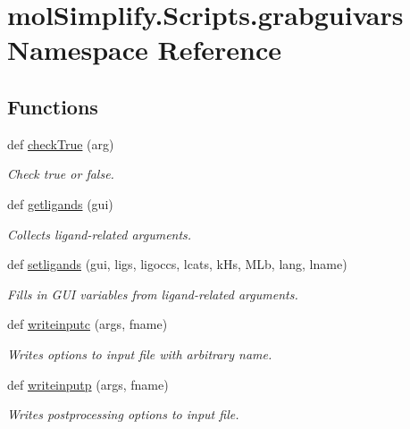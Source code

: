 \hypertarget{namespacemolSimplify_1_1Scripts_1_1grabguivars}{}\section{mol\+Simplify.\+Scripts.\+grabguivars Namespace Reference}
\label{namespacemolSimplify_1_1Scripts_1_1grabguivars}
\subsection*{Functions}
\begin{DoxyCompactItemize}
\item 
def \hyperlink{namespacemolSimplify_1_1Scripts_1_1grabguivars_ada1b06231e634df1c41e807d8d1c9a94}{check\+True} (arg)
\begin{DoxyCompactList}\small\item\em Check true or false. \end{DoxyCompactList}\item 
def \hyperlink{namespacemolSimplify_1_1Scripts_1_1grabguivars_a872962bfed51e6ca90b81fe291cd56b5}{getligands} (gui)
\begin{DoxyCompactList}\small\item\em Collects ligand-\/related arguments. \end{DoxyCompactList}\item 
def \hyperlink{namespacemolSimplify_1_1Scripts_1_1grabguivars_a07e656edb58bbc9b65ef74aca290448e}{setligands} (gui, ligs, ligoccs, lcats, k\+Hs, M\+Lb, lang, lname)
\begin{DoxyCompactList}\small\item\em Fills in G\+UI variables from ligand-\/related arguments. \end{DoxyCompactList}\item 
def \hyperlink{namespacemolSimplify_1_1Scripts_1_1grabguivars_a41afe386ede9bec99dfd85e204d07f12}{writeinputc} (args, fname)
\begin{DoxyCompactList}\small\item\em Writes options to input file with arbitrary name. \end{DoxyCompactList}\item 
def \hyperlink{namespacemolSimplify_1_1Scripts_1_1grabguivars_a7acd94b8d2ba1e2617dd7aad7baff298}{writeinputp} (args, fname)
\begin{DoxyCompactList}\small\item\em Writes postprocessing options to input file. \end{DoxyCompactList}\item 

\end{DoxyCompactItemize}
